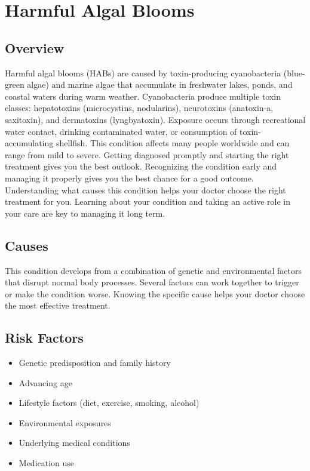 \chapter{Harmful Algal Blooms}
\label{sec:Harmful Algal Blooms}

\section{Overview}
Harmful algal blooms (HABs) are caused by toxin-producing cyanobacteria (blue-green algae) and marine algae that accumulate in freshwater lakes, ponds, and coastal waters during warm weather. Cyanobacteria produce multiple toxin classes: hepatotoxins (microcystins, nodularins), neurotoxins (anatoxin-a, saxitoxin), and dermatoxins (lyngbyatoxin). Exposure occurs through recreational water contact, drinking contaminated water, or consumption of toxin-accumulating shellfish. This condition affects many people worldwide and can range from mild to severe. Getting diagnosed promptly and starting the right treatment gives you the best outlook. Recognizing the condition early and managing it properly gives you the best chance for a good outcome. Understanding what causes this condition helps your doctor choose the right treatment for you. Learning about your condition and taking an active role in your care are key to managing it long term.

\section{Causes}
This condition develops from a combination of genetic and environmental factors that disrupt normal body processes. Several factors can work together to trigger or make the condition worse. Knowing the specific cause helps your doctor choose the most effective treatment.

\section{Risk Factors}

\begin{itemize}[noitemsep]
  \item Genetic predisposition and family history
  \item Advancing age
  \item Lifestyle factors (diet, exercise, smoking, alcohol)
  \item Environmental exposures
  \item Underlying medical conditions
  \item Medication use
\end{itemize}

